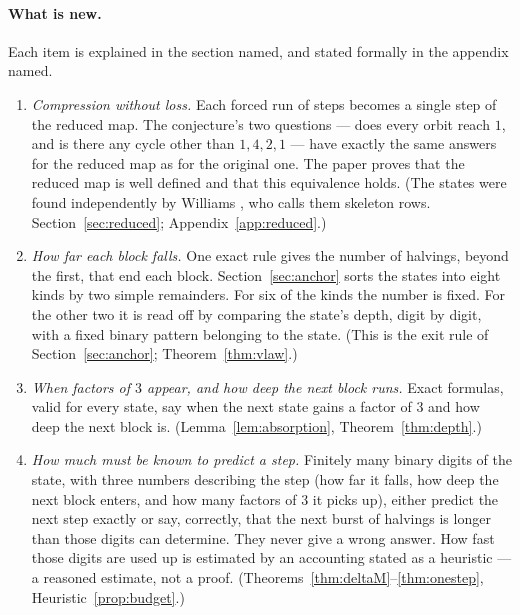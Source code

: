 \documentclass[11pt]{article}
\theoremstyle{remark}
\begin{document}
\paragraph{What is new.} Each item is explained in the section named, and stated formally in the appendix named.
\begin{enumerate}
\item[(i)] \emph{Compression without loss.} Each forced run of steps becomes a single step of the reduced map. The conjecture's two questions --- does every orbit reach $1$, and is there any cycle other than $1, 4, 2, 1$ --- have exactly the same answers for the reduced map as for the original one. The paper proves that the reduced map is well defined and that this equivalence holds. (The states were found independently by Williams \cite{williams}, who calls them skeleton rows. Section~\ref{sec:reduced}; Appendix~\ref{app:reduced}.)
\item[(ii)] \emph{How far each block falls.} One exact rule gives the number of halvings, beyond the first, that end each block. Section~\ref{sec:anchor} sorts the states into eight kinds by two simple remainders. For six of the kinds the number is fixed. For the other two it is read off by comparing the state's depth, digit by digit, with a fixed binary pattern belonging to the state. (This is the exit rule of Section~\ref{sec:anchor}; Theorem~\ref{thm:vlaw}.)
\item[(iii)] \emph{When factors of $3$ appear, and how deep the next block runs.} Exact formulas, valid for every state, say when the next state gains a factor of $3$ and how deep the next block is. (Lemma~\ref{lem:absorption}, Theorem~\ref{thm:depth}.)
\item[(iv)] \emph{How much must be known to predict a step.} Finitely many binary digits of the state, with three numbers describing the step (how far it falls, how deep the next block enters, and how many factors of $3$ it picks up), either predict the next step exactly or say, correctly, that the next burst of halvings is longer than those digits can determine. They never give a wrong answer. How fast those digits are used up is estimated by an accounting stated as a heuristic --- a reasoned estimate, not a proof. (Theorems~\ref{thm:deltaM}--\ref{thm:onestep}, Heuristic~\ref{prop:budget}.)

\end{enumerate}
\end{document}
